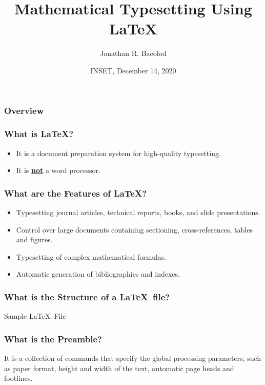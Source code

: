 \documentclass[17pt]{beamer}
\title[Math Typesetting Using \LaTeX] {Mathematical Typesetting Using \LaTeX}
\author{Jonathan R. Bacolod}
\institute[SHS]{Sauyo High School}
\date[INSET, Dec. 2020]{INSET, December 14, 2020}
\begin{document}
	\frame{\titlepage}

	\begin{frame}
		\frametitle{Overview}
		\tableofcontents 
	\end{frame}

    \begin{frame}
    	\frametitle{What is \LaTeX?}
    	\begin{itemize}
    		\item It is a document preparation system for high-quality typesetting.
    		\item \pause It is \textbf{\underline{not}} a word processor.
    	\end{itemize}
    \end{frame}	

	\begin{frame}
		\frametitle{What are the Features of \LaTeX?}
		\footnotesize
		\begin{itemize}
			\item Typesetting journal articles, technical reports, books, and slide presentations.
			\item \pause Control over large documents containing sectioning, cross-references, tables and figures.
			\item \pause Typesetting of complex mathematical formulas.
			\item \pause Automatic generation of bibliographies and indexes.
		\end{itemize}
	\end{frame}	
	

	\begin{frame}
		\frametitle{What is the Structure of a \LaTeX\ file?}
		Sample \LaTeX\ File
		
	
	
	\end{frame}

	\begin{frame}
		\frametitle{What is the Preamble?}
		
		
		
		It is a collection of commands that specify the global processing parameters, such as paper format, height and width of the text, automatic page heads and footlines.
		
	\end{frame}	
\end{document}
